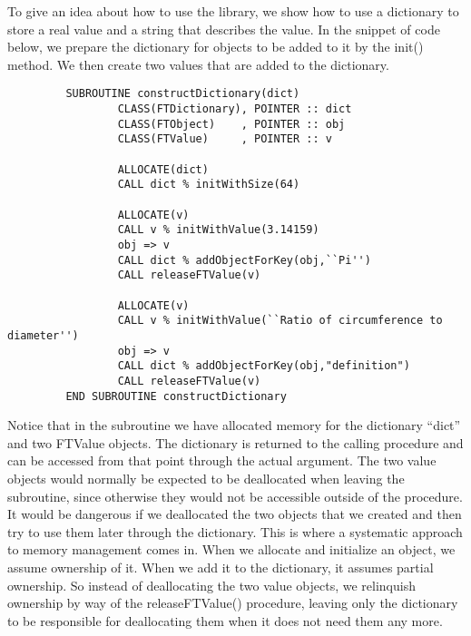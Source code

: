 \documentclass[9pt]{article}
\begin{document}
To give an idea about how to use the library, we show how to use a dictionary to store a real value and a string that describes the value.
In the snippet of code below, we prepare the dictionary for objects to be added to it by the init() method. We then create two values that are
added to the dictionary. 

{\color{blue}\begin{verbatim}
         SUBROUTINE constructDictionary(dict)
                 CLASS(FTDictionary), POINTER :: dict
                 CLASS(FTObject)    , POINTER :: obj
                 CLASS(FTValue)     , POINTER :: v
                 
                 ALLOCATE(dict)
                 CALL dict % initWithSize(64)
	         
                 ALLOCATE(v)
                 CALL v % initWithValue(3.14159)
                 obj => v
                 CALL dict % addObjectForKey(obj,``Pi'')
                 CALL releaseFTValue(v)
	         
                 ALLOCATE(v)
                 CALL v % initWithValue(``Ratio of circumference to diameter'')
                 obj => v
                 CALL dict % addObjectForKey(obj,"definition")
                 CALL releaseFTValue(v)
         END SUBROUTINE constructDictionary
\end{verbatim}}
 
 Notice that in the subroutine we have allocated memory for the dictionary ``dict'' and two FTValue objects. The dictionary
 is returned to the calling procedure and can be accessed from that point through the actual argument. The two value objects would normally
 be expected to be deallocated when leaving the subroutine, since otherwise they would not be accessible outside
 of the procedure. It would be dangerous if we deallocated the two objects that we created and then try to use them later through
the dictionary. This is where a systematic approach to memory management comes in. When we allocate and initialize an object, we assume ownership of it.
When we add it to the dictionary, it assumes partial ownership. So instead of deallocating the two value objects, we relinquish ownership
by way of the releaseFTValue() procedure, leaving only the dictionary to be responsible for deallocating them when it does not need them any more.
\end{document}
